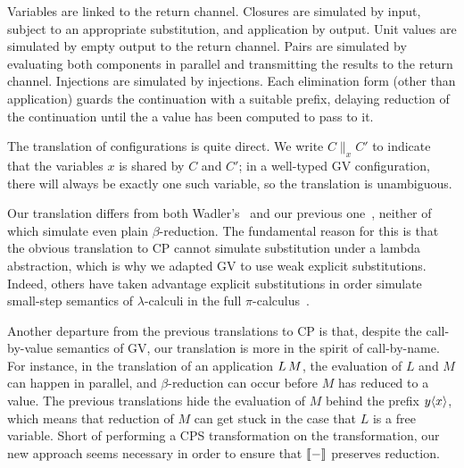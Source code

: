 \documentclass[oribibl,orivec,envcountsame]{llncs}
\begin{document}
Variables are linked to the return channel. Closures are simulated by input, subject to an
appropriate substitution, and application by output. Unit values are simulated by empty output to
the return channel. Pairs are simulated by evaluating both components in parallel and transmitting
the results to the return channel. Injections are simulated by injections. Each elimination form
(other than application) guards the continuation with a suitable prefix, delaying reduction of the
continuation until the a value has been computed to pass to it.

The translation of configurations is quite direct. We write $C \parallel_x C'$ to indicate that the
variables $x$ is shared by $C$ and $C'$; in a well-typed GV configuration, there will always be
exactly one such variable, so the translation is unambiguous.

Our translation differs from both Wadler's~\cite{Wadler14} and our previous one~\cite{LindleyM14},
neither of which simulate even plain $\beta$-reduction. The fundamental reason for this is that the
obvious translation to CP cannot simulate substitution under a lambda abstraction, which is why we
adapted GV to use weak explicit substitutions.
%
Indeed, others have taken advantage explicit substitutions in order simulate small-step semantics of
$\lambda$-calculi in the full $\pi$-calculus~\cite{BakelV09}.

Another departure from the previous translations to CP is that, despite the call-by-value semantics
of GV, our translation is more in the spirit of call-by-name. For instance, in the translation of an
application $L \, M$, the evaluation of $L$ and $M$ can happen in parallel, and $\beta$-reduction
can occur before $M$ has reduced to a value. The previous translations hide the evaluation of $M$
behind the prefix $y\langle x\rangle$, which means that reduction of $M$ can get stuck in the case that $L$ is
a free variable.
%
Short of performing a CPS transformation on the transformation, our new approach seems necessary in
order to ensure that $\llbracket - \rrbracket$ preserves reduction.
\end{document}
